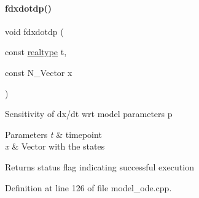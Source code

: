 \paragraph{\texorpdfstring{fdxdotdp()}{fdxdotdp()}\hspace{0.1cm}{\footnotesize\ttfamily [1/3]}}
{\footnotesize\ttfamily void fdxdotdp (\begin{DoxyParamCaption}\item[{const \mbox{\hyperlink{namespaceamici_a1bdce28051d6a53868f7ccbf5f2c14a3}{realtype}}}]{t,  }\item[{const N\+\_\+\+Vector}]{x }\end{DoxyParamCaption})}

Sensitivity of dx/dt wrt model parameters p 
\begin{DoxyParams}{Parameters}
{\em t} & timepoint \\
\hline
{\em x} & Vector with the states \\
\hline
\end{DoxyParams}
\begin{DoxyReturn}{Returns}
status flag indicating successful execution 
\end{DoxyReturn}


Definition at line 126 of file model\+\_\+ode.\+cpp.

